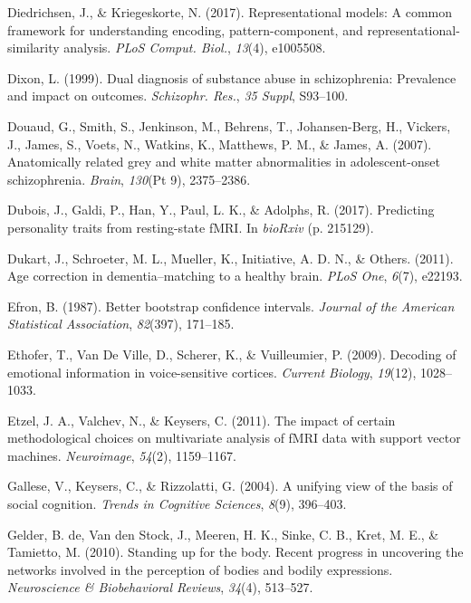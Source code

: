 \documentclass[12pt,american,a4paper,oneside,]{memoir} %
\begin{document}
\leavevmode\hypertarget{ref-Diedrichsen2017-ab}{}%
Diedrichsen, J., \& Kriegeskorte, N. (2017). Representational models: A common framework for understanding encoding, pattern-component, and representational-similarity analysis. \emph{PLoS Comput. Biol.}, \emph{13}(4), e1005508.

\leavevmode\hypertarget{ref-Dixon1999-kl}{}%
Dixon, L. (1999). Dual diagnosis of substance abuse in schizophrenia: Prevalence and impact on outcomes. \emph{Schizophr. Res.}, \emph{35 Suppl}, S93--100.

\leavevmode\hypertarget{ref-Douaud2007-sw}{}%
Douaud, G., Smith, S., Jenkinson, M., Behrens, T., Johansen-Berg, H., Vickers, J., James, S., Voets, N., Watkins, K., Matthews, P. M., \& James, A. (2007). Anatomically related grey and white matter abnormalities in adolescent-onset schizophrenia. \emph{Brain}, \emph{130}(Pt 9), 2375--2386.

\leavevmode\hypertarget{ref-Dubois2017-fl}{}%
Dubois, J., Galdi, P., Han, Y., Paul, L. K., \& Adolphs, R. (2017). Predicting personality traits from resting-state fMRI. In \emph{bioRxiv} (p. 215129).

\leavevmode\hypertarget{ref-Dukart2011-aq}{}%
Dukart, J., Schroeter, M. L., Mueller, K., Initiative, A. D. N., \& Others. (2011). Age correction in dementia--matching to a healthy brain. \emph{PLoS One}, \emph{6}(7), e22193.

\leavevmode\hypertarget{ref-efron1987better}{}%
Efron, B. (1987). Better bootstrap confidence intervals. \emph{Journal of the American Statistical Association}, \emph{82}(397), 171--185.

\leavevmode\hypertarget{ref-ethofer2009decoding}{}%
Ethofer, T., Van De Ville, D., Scherer, K., \& Vuilleumier, P. (2009). Decoding of emotional information in voice-sensitive cortices. \emph{Current Biology}, \emph{19}(12), 1028--1033.

\leavevmode\hypertarget{ref-etzel2011impact}{}%
Etzel, J. A., Valchev, N., \& Keysers, C. (2011). The impact of certain methodological choices on multivariate analysis of fMRI data with support vector machines. \emph{Neuroimage}, \emph{54}(2), 1159--1167.

\leavevmode\hypertarget{ref-gallese2004unifying}{}%
Gallese, V., Keysers, C., \& Rizzolatti, G. (2004). A unifying view of the basis of social cognition. \emph{Trends in Cognitive Sciences}, \emph{8}(9), 396--403.

\leavevmode\hypertarget{ref-de2010standing}{}%
Gelder, B. de, Van den Stock, J., Meeren, H. K., Sinke, C. B., Kret, M. E., \& Tamietto, M. (2010). Standing up for the body. Recent progress in uncovering the networks involved in the perception of bodies and bodily expressions. \emph{Neuroscience \& Biobehavioral Reviews}, \emph{34}(4), 513--527.
\end{document}
